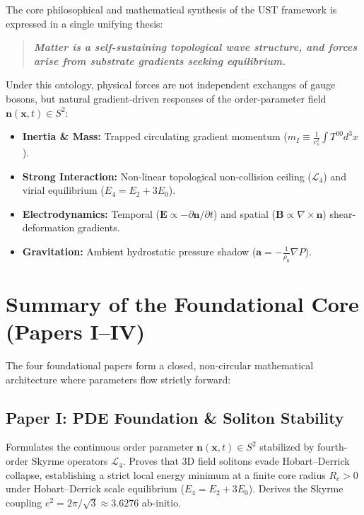 \documentclass[11pt,a4paper]{article}
\begin{document}
	The core philosophical and mathematical synthesis of the UST framework is expressed in a single unifying thesis:
	
	\begin{quote}
		\centering
		\textbf{\textit{Matter is a self-sustaining topological wave structure, and forces arise from substrate gradients seeking equilibrium.}}
	\end{quote}
	
	Under this ontology, physical forces are not independent exchanges of gauge bosons, but natural gradient-driven responses of the order-parameter field $\mathbf{n}(\mathbf{x}, t) \in S^2$:
	\begin{itemize}
		\item \textbf{Inertia \& Mass:} Trapped circulating gradient momentum ($m_I \equiv \frac{1}{c_s^2} \int T^{00} d^3x$).
		\item \textbf{Strong Interaction:} Non-linear topological non-collision ceiling ($\mathcal{L}_4$) and virial equilibrium ($E_4 = E_2 + 3E_0$).
		\item \textbf{Electrodynamics:} Temporal ($\mathbf{E} \propto -\partial \mathbf{n}/\partial t$) and spatial ($\mathbf{B} \propto \nabla \times \mathbf{n}$) shear-deformation gradients.
		\item \textbf{Gravitation:} Ambient hydrostatic pressure shadow ($\mathbf{a} = -\frac{1}{\rho_0}\nabla P$).
	\end{itemize}
	
	\section{Summary of the Foundational Core (Papers I--IV)}
	\label{sec:foundational_core}
	
	The four foundational papers form a closed, non-circular mathematical architecture where parameters flow strictly forward:
	
	\subsection{Paper I: PDE Foundation \& Soliton Stability}
	Formulates the continuous order parameter $\mathbf{n}(\mathbf{x},t) \in S^2$ stabilized by fourth-order Skyrme operators $\mathcal{L}_4$. Proves that 3D field solitons evade Hobart--Derrick collapse, establishing a strict local energy minimum at a finite core radius $R_c > 0$ under Hobart--Derrick scale equilibrium ($E_4 = E_2 + 3E_0$). Derives the Skyrme coupling $e^2 = 2\pi / \sqrt{3} \approx 3.6276$ ab-initio.
	
\end{document}
